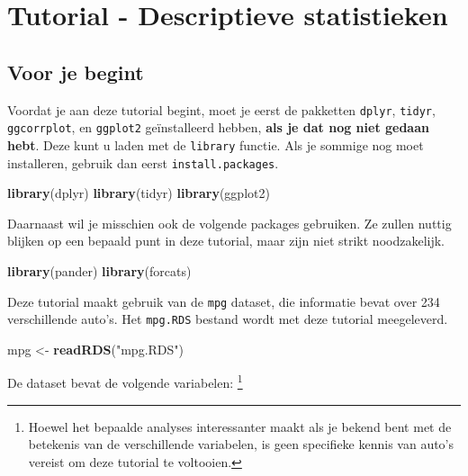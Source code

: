 \documentclass[]{tufte-book}
\newenvironment{Shaded}{}{}
\newcommand{\KeywordTok}[1]{\textcolor[rgb]{0.00,0.44,0.13}{\textbf{#1}}}
\newcommand{\NormalTok}[1]{#1}
\newcommand{\StringTok}[1]{\textcolor[rgb]{0.25,0.44,0.63}{#1}}
\begin{document}
\hypertarget{tutorial---descriptieve-statistieken}{%
\chapter{Tutorial - Descriptieve statistieken}\label{tutorial---descriptieve-statistieken}}

\hypertarget{voor-je-begint-1}{%
\section{Voor je begint}\label{voor-je-begint-1}}

Voordat je aan deze tutorial begint, moet je eerst de pakketten \texttt{dplyr}, \texttt{tidyr}, \texttt{ggcorrplot}, en \texttt{ggplot2} geïnstalleerd hebben, \textbf{als je dat nog niet gedaan hebt}. Deze kunt u laden met de \texttt{library} functie. Als je sommige nog moet installeren, gebruik dan eerst \texttt{install.packages}.

\begin{Shaded}
\begin{Highlighting}[]
\KeywordTok{library}\NormalTok{(dplyr)}
\KeywordTok{library}\NormalTok{(tidyr)}
\KeywordTok{library}\NormalTok{(ggplot2)}
\end{Highlighting}
\end{Shaded}

Daarnaast wil je misschien ook de volgende packages gebruiken. Ze zullen nuttig blijken op een bepaald punt in deze tutorial, maar zijn niet strikt noodzakelijk.

\begin{Shaded}
\begin{Highlighting}[]
\KeywordTok{library}\NormalTok{(pander)}
\KeywordTok{library}\NormalTok{(forcats)}
\end{Highlighting}
\end{Shaded}

Deze tutorial maakt gebruik van de \texttt{mpg} dataset, die informatie bevat over 234 verschillende auto's. Het \texttt{mpg.RDS} bestand wordt met deze tutorial meegeleverd.

\begin{Shaded}
\begin{Highlighting}[]
\NormalTok{mpg <-}\StringTok{ }\KeywordTok{readRDS}\NormalTok{(}\StringTok{"mpg.RDS"}\NormalTok{)}
\end{Highlighting}
\end{Shaded}

De dataset bevat de volgende variabelen: \footnote{Hoewel het bepaalde analyses interessanter maakt als je bekend bent met de betekenis van de verschillende variabelen, is geen specifieke kennis van auto's vereist om deze tutorial te voltooien.}
\end{document}
